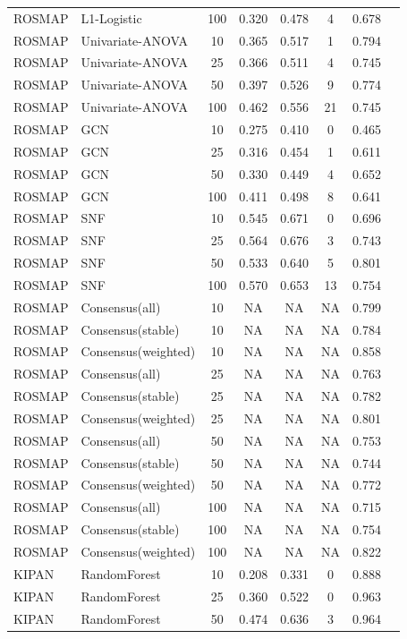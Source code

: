 \documentclass[utf8]{frontiers_suppmat}
\begin{document}
\begin{longtable}{llcccccc}
ROSMAP & L1-Logistic & 100 & 0.320 & 0.478 & 4 & 0.678 \\
ROSMAP & Univariate-ANOVA & 10 & 0.365 & 0.517 & 1 & 0.794 \\
ROSMAP & Univariate-ANOVA & 25 & 0.366 & 0.511 & 4 & 0.745 \\
ROSMAP & Univariate-ANOVA & 50 & 0.397 & 0.526 & 9 & 0.774 \\
ROSMAP & Univariate-ANOVA & 100 & 0.462 & 0.556 & 21 & 0.745 \\
ROSMAP & GCN & 10 & 0.275 & 0.410 & 0 & 0.465 \\
ROSMAP & GCN & 25 & 0.316 & 0.454 & 1 & 0.611 \\
ROSMAP & GCN & 50 & 0.330 & 0.449 & 4 & 0.652 \\
ROSMAP & GCN & 100 & 0.411 & 0.498 & 8 & 0.641 \\
ROSMAP & SNF & 10 & 0.545 & 0.671 & 0 & 0.696 \\
ROSMAP & SNF & 25 & 0.564 & 0.676 & 3 & 0.743 \\
ROSMAP & SNF & 50 & 0.533 & 0.640 & 5 & 0.801 \\
ROSMAP & SNF & 100 & 0.570 & 0.653 & 13 & 0.754 \\
ROSMAP & Consensus(all) & 10 & NA & NA & NA & 0.799 \\
ROSMAP & Consensus(stable) & 10 & NA & NA & NA & 0.784 \\
ROSMAP & Consensus(weighted) & 10 & NA & NA & NA & 0.858 \\
ROSMAP & Consensus(all) & 25 & NA & NA & NA & 0.763 \\
ROSMAP & Consensus(stable) & 25 & NA & NA & NA & 0.782 \\
ROSMAP & Consensus(weighted) & 25 & NA & NA & NA & 0.801 \\
ROSMAP & Consensus(all) & 50 & NA & NA & NA & 0.753 \\
ROSMAP & Consensus(stable) & 50 & NA & NA & NA & 0.744 \\
ROSMAP & Consensus(weighted) & 50 & NA & NA & NA & 0.772 \\
ROSMAP & Consensus(all) & 100 & NA & NA & NA & 0.715 \\
ROSMAP & Consensus(stable) & 100 & NA & NA & NA & 0.754 \\
ROSMAP & Consensus(weighted) & 100 & NA & NA & NA & 0.822 \\
KIPAN & RandomForest & 10 & 0.208 & 0.331 & 0 & 0.888 \\
KIPAN & RandomForest & 25 & 0.360 & 0.522 & 0 & 0.963 \\
KIPAN & RandomForest & 50 & 0.474 & 0.636 & 3 & 0.964 \\

\end{longtable}
\end{document}
